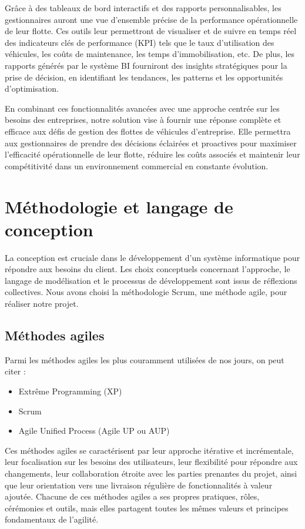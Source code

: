 Grâce à des tableaux de bord interactifs et des rapports personnalisables, les gestionnaires auront une vue d'ensemble précise de la performance opérationnelle de leur flotte. Ces outils leur permettront de visualiser et de suivre en temps réel des indicateurs clés de performance (KPI) tels que le taux d'utilisation des véhicules, les coûts de maintenance, les temps d'immobilisation, etc. De plus, les rapports générés par le système BI fourniront des insights stratégiques pour la prise de décision, en identifiant les tendances, les patterns et les opportunités d'optimisation.

En combinant ces fonctionnalités avancées avec une approche centrée sur les besoins des entreprises, notre solution vise à fournir une réponse complète et efficace aux défis de gestion des flottes de véhicules d’entreprise. Elle permettra aux gestionnaires de prendre des décisions éclairées et proactives pour maximiser l'efficacité opérationnelle de leur flotte, réduire les coûts associés et maintenir leur compétitivité dans un environnement commercial en constante évolution.






\section{Méthodologie et langage de conception}
La conception est cruciale dans le développement d'un système informatique pour répondre aux besoins du client. Les choix conceptuels concernant l'approche, le langage de modélisation et le processus de développement sont issus de réflexions collectives. Nous avons choisi la méthodologie Scrum, une méthode agile, pour réaliser notre projet.
\subsection { Méthodes agiles}
\noindent Parmi les méthodes agiles les plus couramment utilisées de nos jours, on peut citer :

\begin{itemize}[label=$\square$]
    \item Extrême Programming (XP)
    \item Scrum
    \item Agile Unified Process (Agile UP ou AUP)
\end{itemize}


Ces méthodes agiles se caractérisent par leur approche itérative et incrémentale, leur focalisation sur les besoins des utilisateurs, leur flexibilité pour répondre aux changements, leur collaboration étroite avec les parties prenantes du projet, ainsi que leur orientation vers une livraison régulière de fonctionnalités à valeur ajoutée. Chacune de ces méthodes agiles a ses propres pratiques, rôles, cérémonies et outils, mais elles partagent toutes les mêmes valeurs et principes fondamentaux de l'agilité.\\

